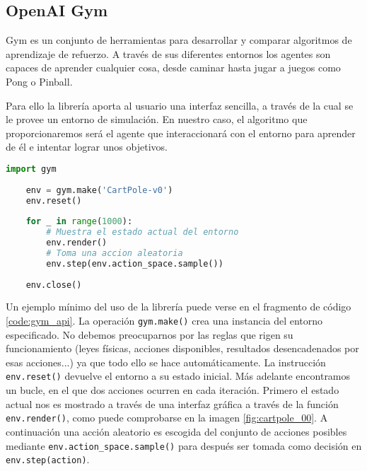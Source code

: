 \subsection{OpenAI Gym}
\label{sec:openai}
Gym es un conjunto de herramientas para desarrollar y comparar algoritmos de aprendizaje de refuerzo. A través de sus diferentes entornos los agentes son capaces de aprender cualquier cosa, desde caminar hasta jugar a juegos como Pong o Pinball.

Para ello la librería aporta al usuario una interfaz sencilla, a través de la cual se le provee un entorno de simulación. En nuestro caso, el algoritmo que proporcionaremos será el agente que interaccionará con el entorno para aprender de él e intentar lograr unos objetivos.

\begin{minipage}{0.9\linewidth}%
    \begin{lstlisting}[frame=tb, language=Python, caption=Creación y renderizado del entorno CartPole, label=code:gym_api]
    import gym
    
    env = gym.make('CartPole-v0')
    env.reset()
    
    for _ in range(1000):
        # Muestra el estado actual del entorno
        env.render()
        # Toma una accion aleatoria
        env.step(env.action_space.sample())
    
    env.close()
    \end{lstlisting}%
\end{minipage}

Un ejemplo mínimo del uso de la librería puede verse en el fragmento de código \ref{code:gym_api}. La operación \texttt{gym.make()} crea una instancia del entorno especificado. No debemos preocuparnos por las reglas que rigen su funcionamiento (leyes físicas, acciones disponibles, resultados desencadenados por esas acciones...) ya que todo ello se hace automáticamente. La instrucción \texttt{env.reset()} devuelve el entorno a su estado inicial. Más adelante encontramos un bucle, en el que dos acciones ocurren en cada iteración. Primero el estado actual nos es mostrado a través de una interfaz gráfica a través de la función \texttt{env.render()}, como puede comprobarse en la imagen \ref{fig:cartpole_00}. A continuación una acción aleatorio es escogida del conjunto de acciones posibles mediante \texttt{env.action\_space.sample()} para después ser tomada como decisión en \texttt{env.step(action)}.

